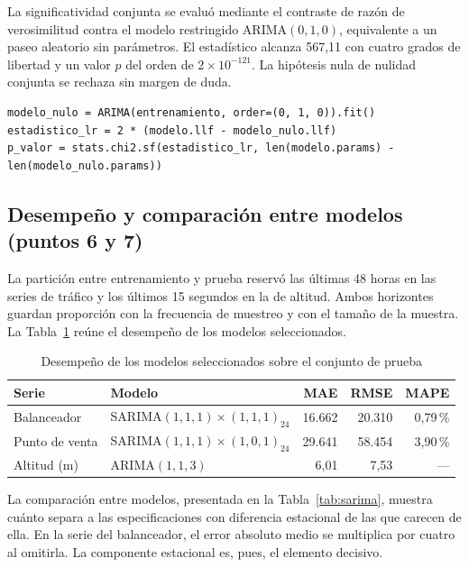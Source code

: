 La significatividad conjunta se evaluó mediante el contraste de razón de verosimilitud contra
el modelo restringido ARIMA$(0,1,0)$, equivalente a un paseo aleatorio sin parámetros. El
estadístico alcanza 567,11 con cuatro grados de libertad y un valor $p$ del orden de
$2 \times 10^{-121}$. La hipótesis nula de nulidad conjunta se rechaza sin margen de duda.

\begin{lstlisting}[caption={Contraste de significatividad global por razón de verosimilitud}]
modelo_nulo = ARIMA(entrenamiento, order=(0, 1, 0)).fit()
estadistico_lr = 2 * (modelo.llf - modelo_nulo.llf)
p_valor = stats.chi2.sf(estadistico_lr, len(modelo.params) - len(modelo_nulo.params))
\end{lstlisting}

\subsection{Desempeño y comparación entre modelos (puntos 6 y 7)}

La partición entre entrenamiento y prueba reservó las últimas 48 horas en las series de
tráfico y los últimos 15 segundos en la de altitud. Ambos horizontes guardan proporción con la
frecuencia de muestreo y con el tamaño de la muestra. La Tabla~\ref{tab:metricas} reúne el
desempeño de los modelos seleccionados.

\begin{table}[htbp]
\centering
\caption{Desempeño de los modelos seleccionados sobre el conjunto de prueba}
\label{tab:metricas}
\small
\begin{tabular}{llrrr}
\toprule
\textbf{Serie} & \textbf{Modelo} & \textbf{MAE} & \textbf{RMSE} & \textbf{MAPE} \\
\midrule
Balanceador & SARIMA$(1,1,1)\times(1,1,1)_{24}$ & 16.662 & 20.310 & 0,79\,\% \\
Punto de venta & SARIMA$(1,1,1)\times(1,0,1)_{24}$ & 29.641 & 58.454 & 3,90\,\% \\
Altitud (m) & ARIMA$(1,1,3)$ & 6,01 & 7,53 & --- \\
\bottomrule
\end{tabular}
\end{table}

La comparación entre modelos, presentada en la Tabla~\ref{tab:sarima}, muestra cuánto separa a las especificaciones con diferencia estacional de las que carecen de ella. En la serie del balanceador, el error absoluto medio se multiplica por cuatro al
omitirla. La componente estacional es, pues, el elemento decisivo.

